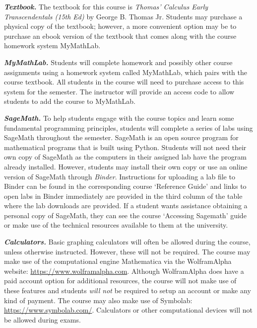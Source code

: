 \documentclass[11pt,letterpaper]{article}
\begin{document}

{\itshape\bfseries\color{scred}Textbook.} The textbook for this course is {\itshape Thomas' Calculus Early Transcendentals (15th Ed)} by George B. Thomas Jr. Students may purchase a physical copy of the textbook; however, a more convenient option may be to purchase an ebook version of the textbook that comes along with the course homework system MyMathLab. \pspace





\newpage





{\itshape\bfseries\color{scred}MyMathLab.} Students will complete homework and possibly other course assignments using a homework system called MyMathLab, which pairs with the course textbook. All students in the course will need to purchase access to this system for the semester. The instructor will provide an access code to allow students to add the course to MyMathLab. \pspace

{\itshape\bfseries\color{scred}SageMath.} To help students engage with the course topics and learn some fundamental programming principles, students will complete a series of labs using SageMath throughout the semester. SageMath is an open source program for mathematical programs that is built using Python. Students will not need their own copy of SageMath as the computers in their assigned lab have the program already installed. However, students may install their own copy or use an online version of SageMath through \textit{Binder}. Instructions for uploading a lab file to Binder can be found in the corresponding course `Reference Guide' and links to open labs in Binder immediately are provided in the third column of the table where the lab downloads are provided. If a student wants assistance obtaining a personal copy of SageMath, they can see the course `Accessing Sagemath' guide or make use of the technical resources available to them at the university. \pspace

{\itshape\bfseries\color{scred}Calculators.} Basic graphing calculators will often be allowed during the course, unless otherwise instructed. However, these will not be required. The course may make use of the computational engine Mathematica via the WolframAlpha website: \url{https://www.wolframalpha.com}. Although WolframAlpha does have a paid account option for additional resources, the course will not make use of these features and students {\itshape will not} be required to setup an account or make any kind of payment. The course may also make use of Symbolab: \url{https://www.symbolab.com/}. Calculators or other computational devices will not be allowed during exams. 
\sectionbreak
\end{document}
